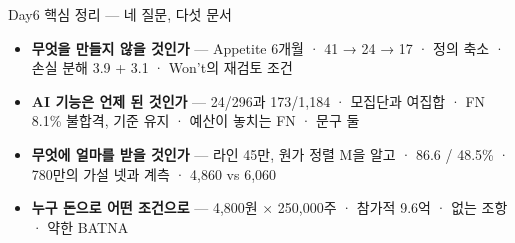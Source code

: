 \begin{frame}{Day6 핵심 정리 — 네 질문, 다섯 문서}
\begin{itemize}
\item \textbf{무엇을 만들지 않을 것인가} — Appetite 6개월 · 41 → 24 → 17 · 정의 축소 · 손실 분해 3.9 + 3.1 · Won't의 재검토 조건
\item \textbf{AI 기능은 언제 된 것인가} — 24/296과 173/1,184 · 모집단과 여집합 · FN 8.1\% 불합격, 기준 유지 · 예산이 놓치는 FN · 문구 둘
\item \textbf{무엇에 얼마를 받을 것인가} — 라인 45만, 원가 정렬 M을 알고 · 86.6 / 48.5\% · 780만의 가설 넷과 계측 · 4,860 vs 6,060
\item \textbf{누구 돈으로 어떤 조건으로} — 4,800원 × 250,000주 · 참가적 9.6억 · 없는 조항 · 약한 BATNA
\end{itemize}
\end{frame}
